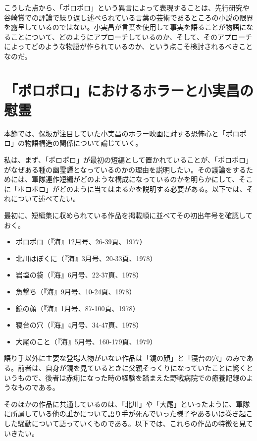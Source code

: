 こうした点から、「ポロポロ」という異言によって表現することは、先行研究や谷崎賞での評論で繰り返し述べられている言葉の芸術であるところの小説の限界を露呈しているのではない。小実昌が言葉を使用して事実を語ることが物語になることについて、どのようにアプローチしているのか、そして、そのアプローチによってどのような物語が作られているのか、という点こそ検討されるべきことなのだ。

\section{「ポロポロ」におけるホラーと小実昌の慰霊}

本節では、保坂が注目していた小実昌のホラー映画に対する恐怖心と「ポロポロ」の物語構造の関係について論じていく。

私は、まず、「ポロポロ」が最初の短編として置かれていることが、「ポロポロ」がなぜある種の幽霊譚となっているのかの理由を説明したい。その議論をするためには、軍隊連作短編がどのような構成になっているのかを明らかにして、そこに「ポロポロ」がどのように当てはまるかを説明する必要がある。以下では、それについて述べてたい。

最初に、短編集に収められている作品を掲載順に並べてその初出年号を確認しておく。

\begin{itemize}
  \item ポロポロ（『海』12月号、26-39頁、1977）
  \item 北川はぼくに（『海』3月号、20-33頁、1978）
  \item 岩塩の袋（『海』6月号、22-37頁、1978）
  \item 魚撃ち（『海』9月号、10-24頁、1978）
  \item 鏡の顔（『海』1月号、87-100頁、1978）
  \item 寝台の穴（『海』4月号、34-47頁、1978）
  \item 大尾のこと（『海』5月号、160-179頁、1979）
\end{itemize}

語り手以外に主要な登場人物がいない作品は「鏡の顔」と「寝台の穴」のみである。前者は、自身が鏡を見ているときに父親そっくりになっていたことに驚くというもので、後者は赤痢になった時の経験を踏まえた野戦病院での療養記録のようなものである。

そのほかの作品に共通しているのは、「北川」や「大尾」といったように、軍隊に所属している他の誰かについて語り手が死んでいった様子やあるいは巻き起こした騒動について語っていくものである。以下では、これらの作品の特徴を見ていきたい。

